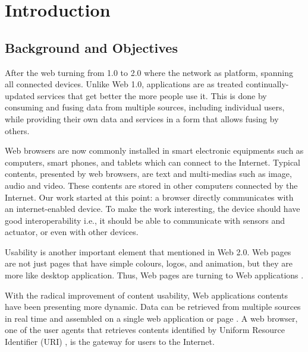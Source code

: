 \chapter{Introduction}
\label{chapter:intro}

\section{Background and Objectives}
After the web turning from 1.0 to 2.0 where the network as platform, spanning all connected devices. Unlike Web 1.0, applications are as treated continually-updated services that get better the more people use it. This is done by consuming and fusing data from multiple sources, including individual users, while providing their own data and services in a form that allows fusing by others\cite{o2005web}.

Web browsers are now commonly installed in smart electronic equipments such as computers, smart phones, and tablets which can connect to the Internet. Typical contents, presented by web browsers, are text and multi-medias such as image, audio and video. These contents are stored in other computers connected by the Internet. Our work started at this point: a browser directly communicates with an internet-enabled device. To make the work interesting, the device should have good interoperability i.e., it should be able to communicate with sensors and actuator, or even with other devices.

Usability is another important element that mentioned in Web 2.0. Web pages are not just pages that have simple colours, logos, and animation, but they are more like desktop application. Thus, Web pages are turning to Web applications  \cite{Lewis:2006:WEB:1217666.1217669}.

With the radical improvement of content usability, Web applications contents have been presenting more dynamic. Data can be retrieved from multiple sources in real time and assembled on a single web application or page \cite{Lewis:2006:WEB:1217666.1217669}. A web browser, one of the user agents that retrieves contents identified by Uniform Resource Identifier (URI) \cite{ArchitectWorldWideWebVolumeOne}, is the gateway for users to the Internet.


